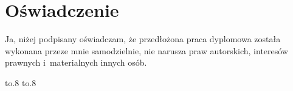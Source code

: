\chapter*{Oświadczenie}%
\par 
\vskip6mm
\noindent
Ja, niżej podpisany oświadczam, że przedłożona praca 
dyplomowa została wykonana przeze mnie samodzielnie, 
nie narusza praw autorskich, interesów prawnych 
i~materialnych innych osób.\endgraf
\par\vskip36mm 
\centerline{\vbox{%
\hbox to.8 
\hbox to.8%
}}\par
